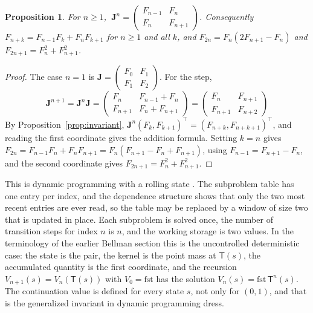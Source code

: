 \documentclass[11pt]{article}
\newtheorem{proposition}{Proposition}
\theoremstyle{definition}
\theoremstyle{remark}
\newcommand{\Tm}{\mathsf{T}}
\begin{document}
\begin{proposition}\label{prop:matrix}
For $n \ge 1$, $\ \mathbf{J}^{n} = \begin{pmatrix}F_{n-1}&F_n\\F_n&F_{n+1}\end{pmatrix}$. Consequently $F_{n+k} = F_{n-1}F_k + F_nF_{k+1}$ for $n \ge 1$ and all $k$, and $F_{2n} = F_n(2F_{n+1} - F_n)$ and $F_{2n+1} = F_n^{2} + F_{n+1}^{2}$.
\end{proposition}

\begin{proof}
The case $n = 1$ is $\mathbf{J} = \begin{pmatrix}F_0&F_1\\F_1&F_2\end{pmatrix}$. For the step,
\[
\mathbf{J}^{n+1} = \mathbf{J}^{n}\mathbf{J} = \begin{pmatrix}F_n&F_{n-1}+F_n\\F_{n+1}&F_n+F_{n+1}\end{pmatrix} = \begin{pmatrix}F_n&F_{n+1}\\F_{n+1}&F_{n+2}\end{pmatrix}
\]
By Proposition~\ref{prop:invariant}, $\mathbf{J}^{n}(F_k, F_{k+1})^{\top} = (F_{n+k}, F_{n+k+1})^{\top}$, and reading the first coordinate gives the addition formula. Setting $k = n$ gives $F_{2n} = F_{n-1}F_n + F_nF_{n+1} = F_n(F_{n+1} - F_n + F_{n+1})$, using $F_{n-1} = F_{n+1} - F_n$, and the second coordinate gives $F_{2n+1} = F_n^{2} + F_{n+1}^{2}$.
\end{proof}

This is dynamic programming with a rolling state \cite[Chapter~14]{cormen2022}. The subproblem table has one entry per index, and the dependence structure shows that only the two most recent entries are ever read, so the table may be replaced by a window of size two that is updated in place. Each subproblem is solved once, the number of transition steps for index $n$ is $n$, and the working storage is two values. In the terminology of the earlier Bellman section this is the uncontrolled deterministic case: the state is the pair, the kernel is the point mass at $\Tm(s)$, the accumulated quantity is the first coordinate, and the recursion $V_{n+1}(s) = V_n(\Tm(s))$ with $V_0 = \mathrm{fst}$ has the solution $V_n(s) = \mathrm{fst}\,\Tm^{n}(s)$. The continuation value is defined for every state $s$, not only for $(0,1)$, and that is the generalized invariant in dynamic programming dress.
\end{document}
